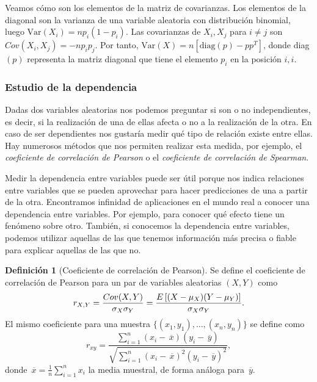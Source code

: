 \documentclass[10pt,a4paper]{article} %
\let\mathbb\relax
\newcommand{\Var}{\text{Var}}
\newcommand{\olsi}[1]{\,\overline{\!{#1}}} %
\theoremstyle{definition}
\newtheorem{definition}{Definición}[section]
\begin{document}
Veamos cómo son los elementos de la matriz de covarianzas. Los elementos de la diagonal son la varianza de una variable aleatoria con distribución binomial, luego $\Var(X_i) = np_i(1-p_i)$. Las covarianzas de $X_i, X_j$ para $i\neq j$ son $Cov(X_i, X_j) = - n p_i p_j$. Por tanto, $\Var(X) = n [\text{diag}(p) - p p^T]$, donde diag$(p)$ representa la matriz diagonal que tiene el elemento $p_i$ en la posición $i,i$.

\subsubsection{Estudio de la dependencia}

Dadas dos variables aleatorias nos podemos preguntar si son o no independientes, es decir, si la realización de una de ellas afecta o no a la realización de la otra. En caso de ser dependientes nos gustaría medir qué tipo de relación existe entre ellas. Hay numerosos métodos que nos permiten realizar esta medida, por ejemplo, el \textit{coeficiente de correlación de Pearson} o el \textit{coeficiente de correlación de Spearman}.

Medir la dependencia entre variables puede ser útil porque nos indica relaciones entre variables que se pueden aprovechar para hacer predicciones de una a partir de la otra. Encontramos infinidad de aplicaciones en el mundo real a conocer una dependencia entre variables. Por ejemplo, para conocer qué efecto tiene un fenómeno sobre otro. También, si conocemos la dependencia entre variables, podemos utilizar aquellas de las que tenemos información más precisa o fiable para explicar aquellas de las que no.

\begin{definition}[Coeficiente de correlación de Pearson]
  Se define el coeficiente de correlación de Pearson para un par de variables aleatorias $(X,Y)$ como\[
r_{X,Y} = \frac{Cov(X,Y)}{\sigma_X\sigma_Y} = \frac{\mathbb{E}\left [ (X- \mu_X)(Y-\mu_Y)\right ]}{\sigma_X\sigma_Y}.
\]
El mismo coeficiente para una muestra $\{(x_1,y_1),\dots,(x_n,y_n)\}$ se define como
\[
r_{xy}=\frac{\sum_{i=1}^n(x_i-\olsi{x})(y_i-\olsi{y})}{\sqrt{\sum_{i=1}^n(x_i-\olsi{x})^2(y_i-\olsi{y})^2}},
\] donde $\olsi{x} = \frac{1}{n}\sum_{i=1}^nx_i$ la media muestral, de forma análoga para $\olsi{y}$.
\end{definition}
\end{document}
